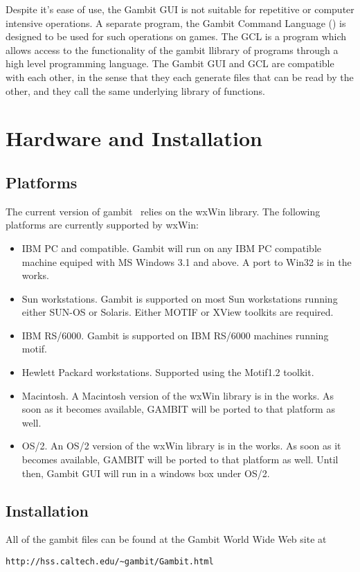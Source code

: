 Despite it's ease of use, the Gambit GUI is not suitable for repetitive or
computer intensive  operations.  A separate program, the Gambit Command
Language () is designed to be used for such operations 
on games.  The
GCL is a program which allows access to the functionality of the gambit
llibrary of programs through a high level programming language.  The
Gambit GUI and GCL  are compatible with each other, in the sense that they
each generate files that can be read by the other, and they call the same
underlying library of functions.


\chapter{Hardware and Installation}
\section{Platforms}
The current version of gambit \ relies on the wxWin 
library.  The following platforms are currently supported by wxWin:
\begin{itemize}
\item IBM PC and compatible.  Gambit will run on any IBM PC compatible machine
equiped with MS Windows 3.1 and above.   A port to Win32 is in the works.
\item Sun workstations.  Gambit is supported on most Sun workstations running
either SUN-OS or Solaris.  Either MOTIF or XView toolkits are required.
\item IBM RS/6000. Gambit is supported on IBM RS/6000 machines running motif.
\item Hewlett Packard workstations.  Supported using the Motif1.2 toolkit.
\item Macintosh. A Macintosh version of the wxWin library is in the works.  As
soon as it becomes available, GAMBIT will be ported to that platform as well.
\item OS/2.  An OS/2 version of the wxWin library is in the works.  As
soon as it becomes available, GAMBIT will be ported to that platform as well.
Until then, Gambit GUI will run in a windows box under OS/2.
\end{itemize}
\section{Installation}
All of the gambit files can be found at the Gambit World Wide Web site
at 

\begin{verbatim}
http://hss.caltech.edu/~gambit/Gambit.html
\end{verbatim}

